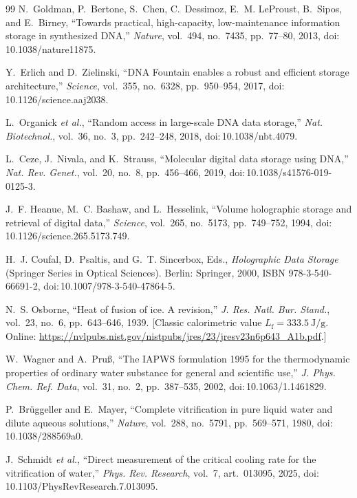 \documentclass[11pt]{article}
\theoremstyle{definition}
\begin{document}
\begin{thebibliography}{99}
N.~Goldman, P.~Bertone, S.~Chen, C.~Dessimoz, E.~M. LeProust, B.~Sipos, and E.~Birney,
``Towards practical, high-capacity, low-maintenance information storage in synthesized
DNA,'' \emph{Nature}, vol.~494, no.~7435, pp.~77--80, 2013, doi:\,10.1038/nature11875.

Y.~Erlich and D.~Zielinski, ``DNA Fountain enables a robust and efficient storage
architecture,'' \emph{Science}, vol.~355, no.~6328, pp.~950--954, 2017,
doi:\,10.1126/science.aaj2038.

L.~Organick \emph{et al.}, ``Random access in large-scale DNA data storage,'' \emph{Nat.
Biotechnol.}, vol.~36, no.~3, pp.~242--248, 2018, doi:\,10.1038/nbt.4079.

L.~Ceze, J.~Nivala, and K.~Strauss, ``Molecular digital data storage using DNA,'' \emph{Nat.
Rev. Genet.}, vol.~20, no.~8, pp.~456--466, 2019, doi:\,10.1038/s41576-019-0125-3.

J.~F. Heanue, M.~C. Bashaw, and L.~Hesselink, ``Volume holographic storage and retrieval of
digital data,'' \emph{Science}, vol.~265, no.~5173, pp.~749--752, 1994,
doi:\,10.1126/science.265.5173.749.

H.~J. Coufal, D.~Psaltis, and G.~T. Sincerbox, Eds., \emph{Holographic Data Storage}
(Springer Series in Optical Sciences). Berlin: Springer, 2000, ISBN 978-3-540-66691-2,
doi:\,10.1007/978-3-540-47864-5.

N.~S. Osborne, ``Heat of fusion of ice. A revision,'' \emph{J. Res. Natl. Bur. Stand.},
vol.~23, no.~6, pp.~643--646, 1939. [Classic calorimetric value $L_{\mathrm{f}}=\qty{333.5}{\joule\per\gram}$.
Online: \url{https://nvlpubs.nist.gov/nistpubs/jres/23/jresv23n6p643_A1b.pdf}.]

W.~Wagner and A.~Pru{\ss}, ``The IAPWS formulation 1995 for the thermodynamic properties of
ordinary water substance for general and scientific use,'' \emph{J. Phys. Chem. Ref. Data},
vol.~31, no.~2, pp.~387--535, 2002, doi:\,10.1063/1.1461829.

P.~Br\"uggeller and E.~Mayer, ``Complete vitrification in pure liquid water and dilute
aqueous solutions,'' \emph{Nature}, vol.~288, no.~5791, pp.~569--571, 1980,
doi:\,10.1038/288569a0.

J.~Schmidt \emph{et al.}, ``Direct measurement of the critical cooling rate for the
vitrification of water,'' \emph{Phys. Rev. Research}, vol.~7, art.~013095, 2025,
doi:\,10.1103/PhysRevResearch.7.013095.


\end{thebibliography}
\end{document}
